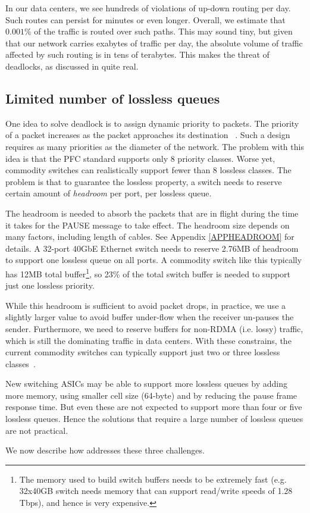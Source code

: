 In our data centers, we see hundreds of violations of up-down routing per
day. Such routes can persist for minutes or even longer. Overall, we estimate
that $0.001\%$ of the traffic is routed over such paths. This may sound tiny,
but given that our network carries exabytes of traffic per day, the absolute
volume of traffic affected by such routing is in tens of terabytes. This makes
the threat of deadlocks, as discussed
in\cite{rdmaatscale,shpiner2016unlocking,hu2016deadlocks} quite real.

\subsection{Limited number of lossless queues}
\label{subsec:pfcheadroom}

One idea to solve deadlock is to assign dynamic priority to packets. The
priority of a packet increases as the packet approaches its destination
~\cite{karol2003prevention}.  Such a design requires as many priorities as the
diameter of the network.  The problem with this idea is that the PFC standard
supports only 8 priority classes. Worse yet, commodity switches can
realistically support fewer than 8 lossless classes.  The problem is that  to
guarantee the lossless property, a switch needs to reserve certain amount of
{\it headroom} per port, per lossless queue.

The headroom is needed to absorb the packets that are in flight during the time
it takes for the PAUSE message to take effect.
The headroom size depends on many factors, including length
of cables. See Appendix \ref{APPHEADROOM} for details.  A
32-port 40GbE Ethernet switch needs to reserve 2.76MB of headroom to support one
lossless queue on all ports. A commodity switch like this typically has
12MB total buffer\footnote{The memory used to build switch buffers needs to be
extremely fast (e.g. 32x40GB switch needs memory that can support read/write
speeds of 1.28 Tbps), and hence is very expensive.}, so 23\%
of the total switch buffer is needed to support just one lossless priority.

While this headroom is sufficient to avoid packet drops, in practice, we use a
slightly larger value to avoid buffer under-flow when the receiver un-pauses the
sender.  Furthermore, we need to reserve buffers for non-RDMA (i.e. lossy)
traffic, which is still the dominating traffic in data centers. With these
constrains, the current commodity switches can typically support just two or
three lossless classes~\cite{rdmaatscale}.

New switching ASICs may be able to support more lossless queues by adding more
memory, using smaller cell size (64-byte) and by reducing the pause frame
response time. But even these are not expected to support more than four or five
lossless queues. Hence the solutions that require a large number of lossless
queues are not practical.

We now describe how \sysname{} addresses these three challenges.
